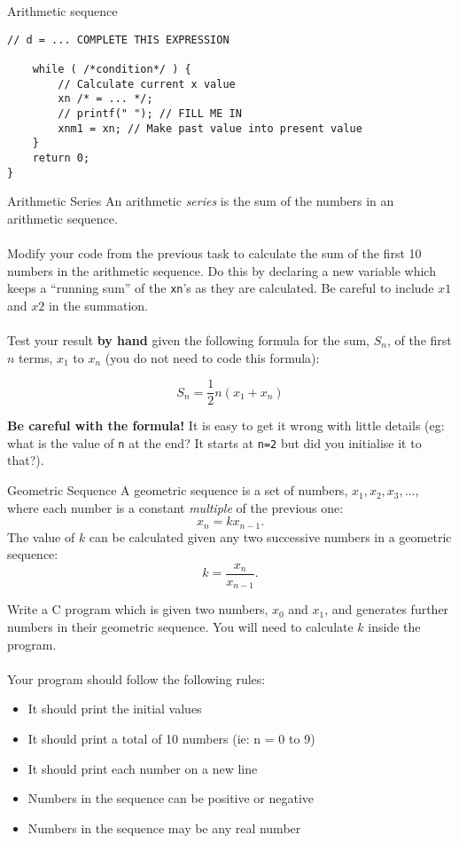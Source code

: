 \documentclass{lab}
\begin{document}
\begin{task}{Arithmetic sequence}{}
\begin{lstlisting}[style=pseudo]
	// d = ... COMPLETE THIS EXPRESSION

	while ( /*condition*/ ) {
		// Calculate current x value
		xn /* = ... */;
		// printf(" ");	// FILL ME IN			
		xnm1 = xn; // Make past value into present value
	}	
	return 0;
}
\end{lstlisting}
\end{task}

\begin{task}{Arithmetic Series}{}
An arithmetic \textit{series} is the sum of the numbers in an arithmetic sequence.
\\ \\
Modify your code from the previous task to calculate the sum of the first 10 numbers in the arithmetic sequence. Do this by declaring a new variable which keeps a ``running sum'' of the \texttt{xn}'s as they are calculated. Be careful to include $x1$ and $x2$ in the summation.
\\ \\
Test your result \textbf{by hand} given the following formula for the sum, $S_n$, of the first $n$ terms, $x_1$ to $x_n$ (you do not need to code this formula):

\begin{equation}
S_n = \frac{1}{2} n (x_1 + x_n)
\end{equation}

\textbf{Be careful with the formula!} It is easy to get it wrong with little details (eg: what is the value of \texttt{n} at the end? It starts at \texttt{n=2} but did you initialise it to that?).

\end{task}

\begin{task}{Geometric Sequence}{}
A geometric sequence is a set of numbers, $x_1, x_2, x_3, ...$, where each number is a constant \textit{multiple} of the previous one:
\begin{equation}
x_{n} = kx_{n-1}.
\end{equation}
The value of $k$ can be calculated given any two successive numbers in a geometric sequence:
\begin{equation}
k = \frac{x_{n}}{x_{n-1}}.
\end{equation}

Write a C program which is given two numbers, $x_0$ and $x_1$, and generates further numbers in their geometric sequence. You will need to calculate $k$ inside the program.
\\ \\
Your program should follow the following rules:
\begin{itemize}
\item It should print the initial values
\item It should print a total of 10 numbers (ie: n = 0 to 9)
\item It should print each number on a new line
\item Numbers in the sequence can be positive or negative
\item Numbers in the sequence may be any real number
\end{itemize}
\end{task}
\end{document}
